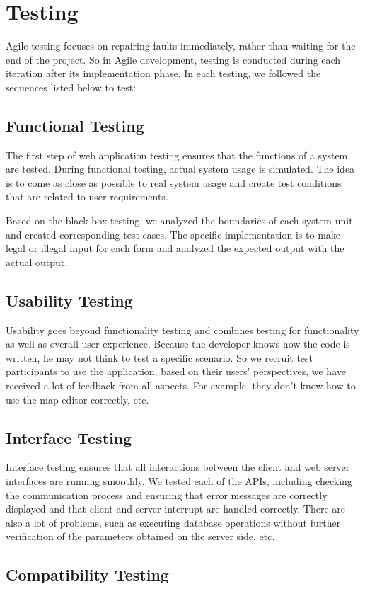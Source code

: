 \section{Testing}
\label{sec:Testing}
Agile testing focuses on repairing faults immediately, rather than waiting for the end of the project. So in Agile development, testing is conducted during each iteration after its implementation phase. In each testing, we followed the sequences listed below to test:

\subsection{Functional Testing}
The first step of web application testing ensures that the functions of a system are tested. During functional testing, actual system usage is simulated. The idea is to come as close as possible to real system usage and create test conditions that are related to user requirements.

Based on the black-box testing, we analyzed the boundaries of each system unit and created corresponding test cases. The specific implementation is to make legal or illegal input for each form and analyzed the expected output with the actual output.

\subsection{Usability Testing}
Usability goes beyond functionality testing and combines testing for functionality as well as overall user experience. Because the developer knows how the code is written, he may not think to test a specific scenario. So we recruit test participants to use the application, based on their users' perspectives, we have received a lot of feedback from all aspects. For example, they don't know how to use the map editor correctly, etc.

\subsection{Interface Testing}
Interface testing ensures that all interactions between the client and web server interfaces are running smoothly. We tested each of the APIs, including checking the communication process and ensuring that error messages are correctly displayed and that client and server interrupt are handled correctly. There are also a lot of problems, such as executing database operations without further verification of the parameters obtained on the server side, etc.

\subsection{Compatibility Testing}
